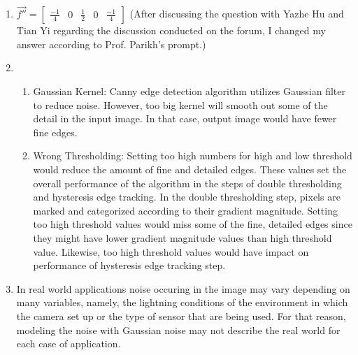 \documentclass{article}
\begin{document}
\begin{enumerate}
	\item $\vec{f''} = \begin{bmatrix}  \frac{-1}{4} & 0 &
	\frac{1}{2} & 0 & \frac{-1}{4}\end{bmatrix}$ (After discussing the question
	with Yazhe Hu and Tian Yi regarding the discussion conducted on the forum,
	I changed my answer according to Prof. Parikh's prompt.) 
	\item %
	\begin{enumerate}
		\item Gaussian Kernel: Canny edge detection algorithm utilizes Gaussian
		filter to reduce noise. However, too big kernel will smooth out some of the
		detail in the input image. In that case, output image would have fewer fine
		edges.
		\item Wrong Thresholding: Setting too high numbers for high and low threshold
		would reduce the amount of fine and detailed edges. These values set the
		overall performance of the algorithm in the steps of double thresholding and
		hysteresis edge tracking. 
		In the double thresholding step, pixels are marked and categorized according
		to their gradient magnitude. Setting too high threshold values would miss some
		of the fine, detailed edges since they might have lower gradient magnitude
		values than high threshold value. Likewise, too high threshold
		values would have impact on performance of hysteresis edge tracking step.
	\end{enumerate}
	\item In real world applications noise occuring in the image may vary
	depending on many variables, namely, the lightning conditions of the
	environment in which the camera set up or the type of sensor that are being
	used. For that reason, modeling the noise with Gaussian noise may not describe
	the real world for each case of application. 

\end{enumerate}
\end{document}
